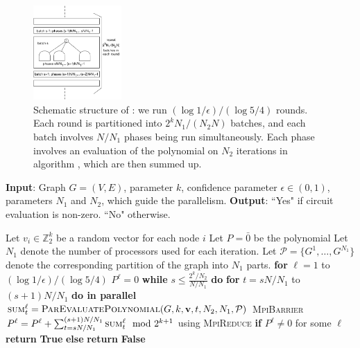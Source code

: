 \begin{figure}[h]
\centering
\includegraphics[width=0.3\textwidth]{img/parallel.pdf}
\caption{
\small
Schematic structure of \parmaxwt{}: we run $(\log{1/\epsilon})/(\log{5/4})$ rounds.
Each round is partitioned into $2^kN_1/(N_2N)$ batches, and each batch involves
$N/N_1$ phases being run simultaneously. Each phase involves an evaluation of the
polynomial on $N_2$ iterations in algorithm \parcircuit{}, which are then summed up.
}
\label{fig:parallel}
\end{figure}

\begin{algorithm}{}
\small
\caption{\parmaxwt{}$(G, k, \epsilon, N_1, N_2)$.}
\label{alg:parallel-kMLD} 
\begin{algorithmic}[1]
\STATE \textbf{Input}: Graph $G=(V,E)$, parameter $k$,
confidence parameter $\epsilon\in (0, 1)$, parameters $N_1$ and $N_2$, which guide the parallelism.
\STATE\textbf{Output}: ``Yes" if circuit evaluation is non-zero. ``No" otherwise.

\STATE Let $v_i \in \mathbb{Z}_2^k$ be a random vector for each node $i$
\STATE Let $P = \bar 0$ be the polynomial
\STATE Let $N_1$ denote the number of processors used for each iteration.
Let $\mathcal{P}=\{G^1, \ldots, G^{N_1}\}$ denote the corresponding partition of the graph into $N_1$ parts.
\STATE \textbf{for} $\ell=1$ to $(\log{1/\epsilon})/(\log{5/4})$ 
\STATE \quad $P^{\ell}=0$
\STATE \quad \textbf{while} $s \leq \frac{2^k/N_2}{N/N_1}$ \textbf{do}
\STATE \quad \quad \textbf{for} $t =s N/N_1$ to $(s+ 1)N/N_1$ \textbf{do in parallel}
\STATE \quad \qquad  $\textsc{sum}^{\ell}_{t} = \textsc{ParEvaluatePolynomial}(G, k, \mathbf{v}, t, N_2, N_1, \mathcal{P})$
\STATE \quad \quad \textsc{MpiBarrier}
\STATE \quad \quad $P^{\ell} = P^{\ell} + \sum_{t=s N/N_1}^{(s+1)N/N_1} \textsc{sum}^{\ell}_{t} \mod 2^{k+1}$ using \textsc{MpiReduce}
\STATE \textbf{if} $P^{\ell}\neq 0$ for some $\ell$
\STATE \quad \textbf{return} \textbf{True}
\STATE \textbf{else} 
\STATE \quad \textbf{return} \textbf{False}
\end{algorithmic}
\end{algorithm}

